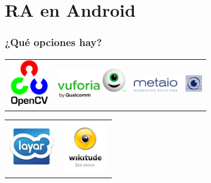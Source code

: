 \section{RA en Android}
\frame
{
\frametitle{¿Qué opciones hay?}
{\setlength{\arrayrulewidth}{0mm}
\begin{table}[ht]
  \centering
  \begin{tabular}{| m{3cm} | m{4cm} | m{4cm} |}
  \hline
  \includegraphics[height=2cm, width=1.8cm]{imgs/opencv.png} & 
     \hspace{2cm}\includegraphics[width=3cm]{imgs/vuforia.png} & 
     \hspace{2cm}\includegraphics[width=3cm]{imgs/metaio.jpg}
  \end{tabular}
\end{table}
}

{\setlength{\arrayrulewidth}{0mm}
\begin{table}[ht]
  \centering
  \begin{tabular}{| m{4cm} | m{4cm} |}
  \hline
  \includegraphics[width=2cm]{imgs/layar.jpg}& \includegraphics[width=2cm]{imgs/wikitude.png}
  \end{tabular}
\end{table}
}
}



